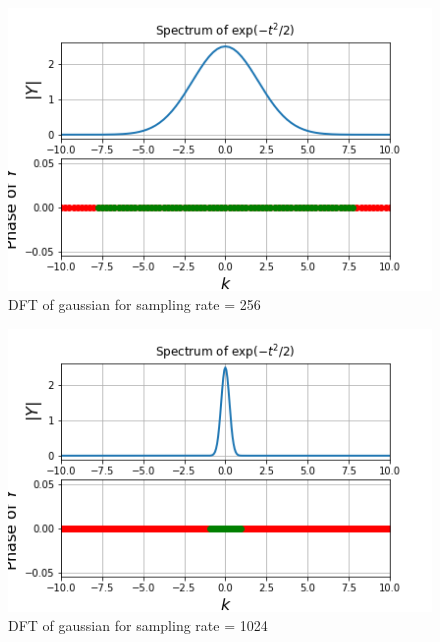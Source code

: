 \documentclass[11pt, a4paper]{article}
\begin{document}
\begin{figure}[!tbh]
   	\centering
   	\includegraphics[scale=0.8]{fig9.png}  %
   	\caption{DFT of gaussian for sampling rate = 256}
   	\label{fig:sample}
   \end{figure} 
 
 \begin{figure}[!tbh]
   	\centering
   	\includegraphics[scale=0.8]{fig10.png}  %
   	\caption{DFT of gaussian for sampling rate = 1024}
   	\label{fig:sample}
   \end{figure} 
\end{document}
